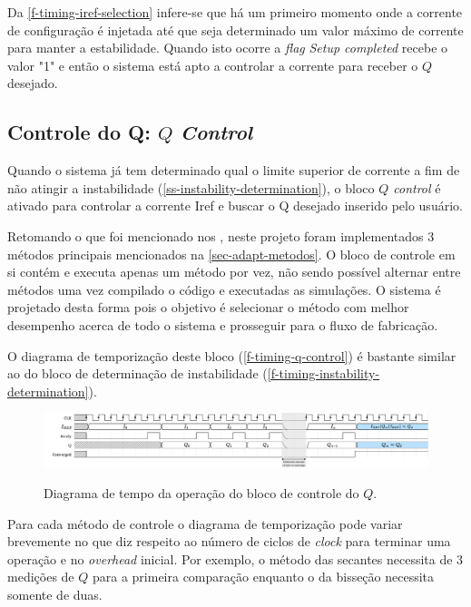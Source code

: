 Da \autoref{f-timing-iref-selection} infere-se que há um primeiro momento onde a corrente de configuração é injetada até que seja determinado um valor máximo de corrente para manter a estabilidade. Quando isto ocorre a \textit{\textit{flag}} \textit{Setup completed} recebe o valor "1"\; e então o sistema está apto a controlar a corrente para receber o $Q$ desejado.



\subsection{Controle do Q: $Q$ \textit{Control}}\label{ss-q-control}

Quando o sistema já tem determinado qual o limite superior de corrente a fim de não atingir a instabilidade (\autoref{ss-instability-determination}), o bloco \textit{$Q$ control} é ativado para controlar a corrente Iref e buscar o Q desejado inserido pelo usuário.

Retomando o que foi mencionado nos , neste projeto foram implementados 3 métodos principais mencionados na \autoref{sec-adapt-metodos}. O bloco de controle em si contém e executa apenas um método por vez, não sendo possível alternar entre métodos uma vez compilado o código e executadas as simulações. O sistema é projetado desta forma pois o objetivo é selecionar o método com melhor desempenho acerca de todo o sistema e prosseguir para o fluxo de fabricação.

O diagrama de temporização deste bloco (\autoref{f-timing-q-control}) é bastante similar ao do bloco de determinação de instabilidade (\autoref{f-timing-instability-determination}).

\begin{figure}[H]
    \centering
    \caption{Diagrama de tempo da operação do bloco de controle do $Q$.}
    \includegraphics{fig/timing-q-control.pdf}
    \label{f-timing-q-control}
\end{figure}

Para cada método de controle o diagrama de temporização pode variar brevemente no que diz respeito ao número de ciclos de \textit{\textit{clock}} para terminar uma operação e no \textit{overhead} inicial. Por exemplo, o método das secantes necessita de 3 medições de $Q$ para a primeira comparação enquanto o da bisseção necessita somente de duas. 




